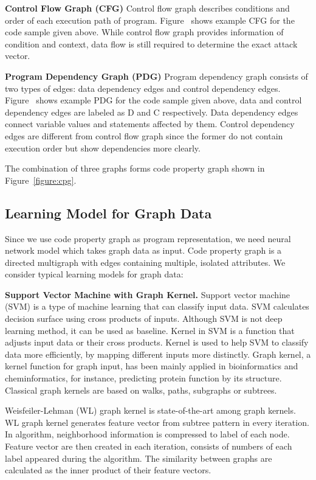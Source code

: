 \textbf{Control Flow Graph (CFG)} Control flow graph describes conditions and order of each execution path of program.
Figure~ shows example CFG for the code sample given above.
While control flow graph provides information of condition and context, data flow is still required to determine the exact attack vector.

\textbf{Program Dependency Graph (PDG)} Program dependency graph consists of two types of edges: data dependency edges and control dependency edges.
Figure~ shows example PDG for the code sample given above, data and control dependency edges are labeled as D and C respectively.
Data dependency edges connect variable values and statements affected by them.
Control dependency edges are different from control flow graph since the former do not contain execution order but show dependencies more clearly.

The combination of three graphs forms code property graph shown in Figure~\ref{figure:cpg}.

\subsection{Learning Model for Graph Data}

Since we use code property graph as program representation, we need neural network model which takes graph data as input.
Code property graph is a directed multigraph with edges containing multiple, isolated attributes.
We consider typical learning models for graph data:

\textbf{Support Vector Machine with Graph Kernel.} Support vector machine (SVM) is a type of machine learning that can classify input data.
SVM calculates decision surface using cross products of inputs.
Although SVM is not deep learning method, it can be used as baseline.
Kernel in SVM is a function that adjusts input data or their cross products.
Kernel is used to help SVM to classify data more efficiently, by mapping different inputs more distinctly.
Graph kernel, a kernel function for graph input, has been mainly applied in bioinformatics and cheminformatics, for instance, predicting protein function by its structure.
Classical graph kernels are based on walks, paths, subgraphs or subtrees.

Weisfeiler-Lehman (WL) graph kernel \cite{shervashidze2011weisfeiler} is state-of-the-art among graph kernels.
WL graph kernel generates feature vector from subtree pattern in every iteration.
In algorithm, neighborhood information is compressed to label of each node.
Feature vector are then created in each iteration, consists of numbers of each label appeared during the algorithm.
The similarity between graphs are calculated as the inner product of their feature vectors.

